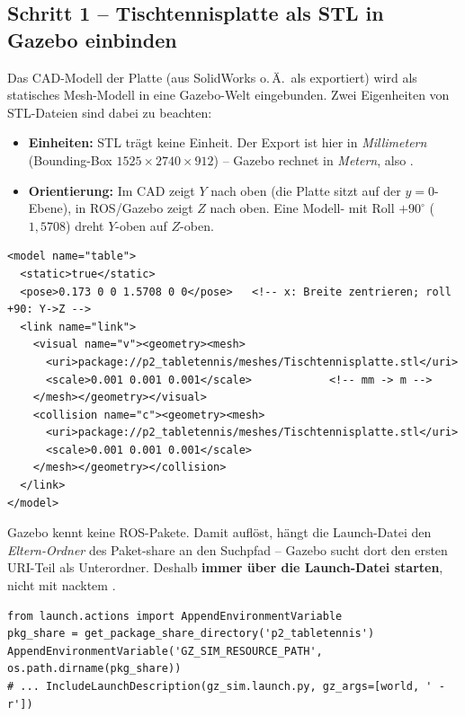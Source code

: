 \subsection{Schritt 1 -- Tischtennisplatte als STL in Gazebo einbinden}
Das CAD-Modell der Platte (aus SolidWorks o.\,Ä.\ als  exportiert)
wird als statisches Mesh-Modell in eine Gazebo-Welt eingebunden. Zwei Eigenheiten
von STL-Dateien sind dabei zu beachten:
\begin{itemize}
\item \textbf{Einheiten:} STL trägt keine Einheit. Der Export ist hier in
  \emph{Millimetern} (Bounding-Box $1525\times2740\times912$) -- Gazebo rechnet in
  \emph{Metern}, also .
\item \textbf{Orientierung:} Im CAD zeigt $Y$ nach oben (die Platte sitzt auf der
  $y=0$-Ebene), in ROS/Gazebo zeigt $Z$ nach oben. Eine Modell- mit
  Roll $+90^\circ$ ($1{,}5708$) dreht $Y$-oben auf $Z$-oben.
\end{itemize}
\begin{lstlisting}[style=xml,caption={\code{worlds/tabletennis.sdf} -- die Platte als Mesh-Modell}]
<model name="table">
  <static>true</static>
  <pose>0.173 0 0 1.5708 0 0</pose>   <!-- x: Breite zentrieren; roll +90: Y->Z -->
  <link name="link">
    <visual name="v"><geometry><mesh>
      <uri>package://p2_tabletennis/meshes/Tischtennisplatte.stl</uri>
      <scale>0.001 0.001 0.001</scale>            <!-- mm -> m -->
    </mesh></geometry></visual>
    <collision name="c"><geometry><mesh>
      <uri>package://p2_tabletennis/meshes/Tischtennisplatte.stl</uri>
      <scale>0.001 0.001 0.001</scale>
    </mesh></geometry></collision>
  </link>
</model>
\end{lstlisting}

\begin{warnbox}[title={Gazebo löst \code{package://} nur über \code{GZ\_SIM\_RESOURCE\_PATH}}]
Gazebo kennt keine ROS-Pakete. Damit 
auflöst, hängt die Launch-Datei den \emph{Eltern-Ordner} des Paket-share an den
Suchpfad -- Gazebo sucht dort den ersten URI-Teil als Unterordner. Deshalb
\textbf{immer über die Launch-Datei starten}, nicht mit nacktem .
\begin{lstlisting}[style=py,caption={\code{launch/table.launch.py} (Kern)}]
from launch.actions import AppendEnvironmentVariable
pkg_share = get_package_share_directory('p2_tabletennis')
AppendEnvironmentVariable('GZ_SIM_RESOURCE_PATH', os.path.dirname(pkg_share))
# ... IncludeLaunchDescription(gz_sim.launch.py, gz_args=[world, ' -r'])
\end{lstlisting}
\end{warnbox}

